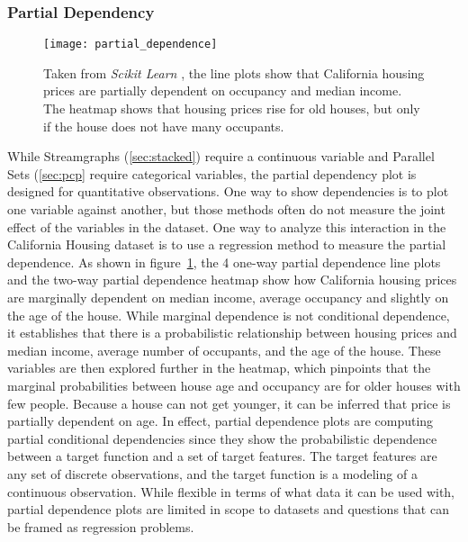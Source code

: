 \documentclass[../main.text]{subfiles}
\begin{document}
\subsubsection{Partial Dependency}
\label{sec:pdp}

\begin{figure}[H]
\texttt{[image: partial\_dependence]}
\caption{Taken from \textit{Scikit Learn} \cite{_partial_????}, the line plots show that California housing prices are partially dependent on occupancy and median income. The heatmap shows that housing prices rise for old houses, but only if the house does not have many occupants.}
\label{fig:partialdependence}
\end{figure}

While Streamgraphs (\ref{sec:stacked}) require a continuous variable and Parallel Sets (\ref{sec:pcp} require categorical variables, the partial dependency plot is designed for quantitative observations. One way to show dependencies is to plot one variable against another, but those methods often do not measure the joint effect of the variables in the dataset. One way to analyze this interaction in the California Housing dataset is to use a regression method \cite{_elements_2009,scikit-learn} to measure the partial dependence. As shown in figure~\ref{fig:partialdependence}, the 4 one-way partial dependence line plots and the two-way partial dependence heatmap show how California housing prices are marginally dependent on median income, average occupancy and slightly on the age of the house. While marginal dependence is not conditional dependence, it establishes that there is a probabilistic relationship between housing prices and median income, average number of occupants, and the age of the house. These variables are then explored further in the heatmap, which pinpoints that the marginal probabilities between house age and occupancy are for older houses with few people. Because a house can not get younger, it can be inferred that price is partially dependent on age. In effect, partial dependence plots are computing partial conditional dependencies since they show the probabilistic dependence between a target function and a set of target features. The target features are any set of discrete observations, and the target function is a modeling of a continuous observation. While flexible in terms of what data it can be used with, partial dependence plots are limited in scope to datasets and questions that can be framed as regression problems. 
\end{document}
